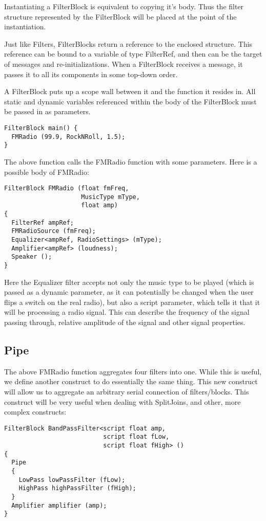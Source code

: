 \documentclass[draft]{article}
\begin{document}
Instantiating a FilterBlock is equivalent to copying it's body.  Thus
the filter structure represented by the FilterBlock will be placed at
the point of the instantiation.

Just like Filters, FilterBlocks return a reference to the enclosed
structure.  This reference can be bound to a variable of type
FilterRef, and then can be the target of messages and
re-initializations.  When a FilterBlock receives a message, it passes
it to all its components in some top-down order.

A FilterBlock puts up a scope wall between it and the function it
resides in.  All static and dynamic variables referenced within the
body of the FilterBlock must be passed in as parameters.

\begin{verbatim}
FilterBlock main() {
  FMRadio (99.9, RockNRoll, 1.5);
}
\end{verbatim}

The above function calls the FMRadio function with some parameters.
Here is a possible body of FMRadio:

\begin{verbatim}
FilterBlock FMRadio (float fmFreq,
                     MusicType mType,
                     float amp)
{
  FilterRef ampRef;
  FMRadioSource (fmFreq);
  Equalizer<ampRef, RadioSettings> (mType);
  Amplifier<ampRef> (loudness);
  Speaker ();
}
\end{verbatim}

Here the Equalizer filter accepts not only the music type to be played
(which is passed as a dynamic parameter, as it can potentially be
changed when the user flips a switch on the real radio), but also a
script parameter, which tells it that it will be processing a radio
signal.  This can describe the frequency of the signal passing
through, relative amplitude of the signal and other signal properties.

\subsection{Pipe}

The above FMRadio function aggregates four filters into one.  While
this is useful, we define another construct to do essentially the same
thing.  This new construct will allow us to aggregate an arbitrary
serial connection of filters/blocks.  This construct will be very
useful when dealing with SplitJoins, and other, more complex
constructs:

\begin{verbatim}
FilterBlock BandPassFilter<script float amp, 
                           script float fLow, 
                           script float fHigh> ()
{
  Pipe
  {
    LowPass lowPassFilter (fLow);
    HighPass highPassFilter (fHigh);
  } 
  Amplifier amplifier (amp);
}
\end{verbatim}
\end{document}
